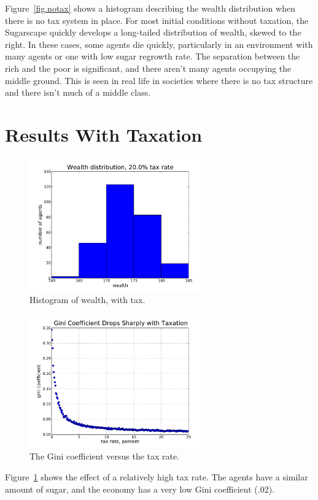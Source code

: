 \documentclass[10pt]{book}
\begin{document}
Figure~\ref{fig.notax} shows a histogram describing the wealth
distribution when there is no tax system in place. For most initial
conditions without taxation, the Sugarscape quickly develops a
long-tailed distribution of wealth, skewed to the right. In these
cases, some agents die quickly, particularly in an environment with
many agents or one with low sugar regrowth rate. The separation
between the rich and the poor is significant, and there aren't many
agents occupying the middle ground. This is seen in real life in
societies where there is no tax structure and there isn't much of a
middle class.


\section{Results With Taxation}

\begin{figure}[ht]
\centerline{\includegraphics[width=3.0in]{figs/pmf_20percent.pdf}}
\caption{Histogram of wealth, with tax.\label{fig.withtax}}
\end{figure}

\begin{figure}[ht]
\centerline{\includegraphics[width=3.0in]{figs/gini_coeff.pdf}}
\caption{The Gini coefficient versus the tax rate.\label{fig.gini}}
\end{figure}

Figure~\ref{fig.withtax} shows the effect of a relatively high tax
rate. The agents have a similar amount of sugar, and the economy has a
very low Gini coefficient (.02).
\end{document}
